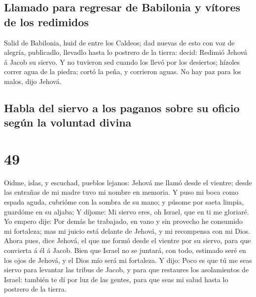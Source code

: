 \hypertarget{llamado-para-regresar-de-babilonia-y-vuxedtores-de-los-redimidos}{%
\subsection{Llamado para regresar de Babilonia y vítores de los
redimidos}\label{llamado-para-regresar-de-babilonia-y-vuxedtores-de-los-redimidos}}

 Salid de Babilonia, huid de entre los Caldeos; dad
nuevas de esto con voz de alegría, publicadlo, llevadlo hasta lo
postrero de la tierra: decid: Redimió Jehová á Jacob su siervo.
 Y no tuvieron sed cuando los llevó por los desiertos;
hízoles correr agua de la piedra; cortó la peña, y corrieron aguas.
 No hay paz para los malos, dijo Jehová.

\hypertarget{habla-del-siervo-a-los-paganos-sobre-su-oficio-seguxfan-la-voluntad-divina}{%
\subsection{Habla del siervo a los paganos sobre su oficio según la
voluntad
divina}\label{habla-del-siervo-a-los-paganos-sobre-su-oficio-seguxfan-la-voluntad-divina}}

\hypertarget{section-48}{%
\section{49}\label{section-48}}

 Oidme, islas, y escuchad, pueblos lejanos: Jehová me
llamó desde el vientre; desde las entrañas de mi madre tuvo mi nombre en
memoria.  Y puso mi boca como espada aguda, cubrióme con
la sombra de su mano; y púsome por saeta limpia, guardóme en su aljaba;
 Y díjome: Mi siervo eres, oh Israel, que en ti me
gloriaré.  Yo empero dije: Por demás he trabajado, en vano
y sin provecho he consumido mi fortaleza; mas mi juicio está delante de
Jehová, y mi recompensa con mi Dios.  Ahora pues, dice
Jehová, el que me formó desde el vientre por su siervo, para que
convierta á él á Jacob. Bien que Israel no se juntará, con todo,
estimado seré en los ojos de Jehová, y el Dios mío será mi fortaleza.
 Y dijo: Poco es que tú me seas siervo para levantar las
tribus de Jacob, y para que restaures los asolamientos de Israel:
también te dí por luz de las gentes, para que seas mi salud hasta lo
postrero de la tierra.

